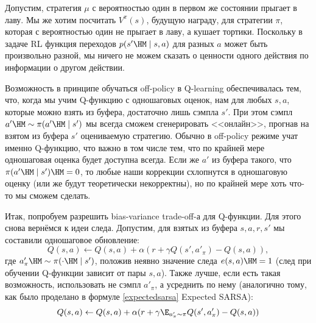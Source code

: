 \begin{example}
Допустим, стратегия $\mu$ с вероятностью один в первом же состоянии прыгает в лаву. Мы же хотим посчитать $V^\pi(s)$, будущую награду, для стратегии $\pi$, которая с вероятностью один не прыгает в лаву, а кушает тортики. Поскольку в задаче RL функция переходов $p(s' \HM \mid s, a)$ для разных $a$ может быть произвольно разной, мы ничего не можем сказать о ценности одного действия по информации о другом действии.
\end{example}

Возможность в принципе обучаться off-policy в Q-learning обеспечивалась тем, что, когда мы учим Q-функцию с одношаговых оценок, нам для любых $s, a$, которые можно взять из буфера, достаточно лишь сэмпла $s'$. При этом сэмпл $a' \HM \sim \pi(a' \HM\mid s')$ мы всегда сможем сгенерировать <<онлайн>>, прогнав на взятом из буфера $s'$ оцениваемую стратегию. Обычно в off-policy режиме учат именно Q-функцию, что важно в том числе тем, что по крайней мере одношаговая оценка будет доступна всегда. Если же $a'$ из буфера такого, что $\pi(a' \HM \mid s') \HM= 0$, то любые наши коррекции схлопнутся в одношаговую оценку (или же будут теоретически некорректны), но по крайней мере хоть что-то мы сможем сделать.

Итак, попробуем разрешить bias-variance trade-off-а для Q-функции. Для этого снова вернёмся к идеи следа. Допустим, для взятых из буфера $s, a, r, s'$ мы составили одношаговое обновление:
$$Q(s, a) \leftarrow Q(s, a) + \alpha (r + \gamma Q(s', a'_\pi) - Q(s, a)),$$
где $a'_\pi \HM \sim \pi(\cdot \HM \mid s')$, положив неявно значение следа $e(s, a) \HM= 1$ (след при обучении Q-функции зависит от пары $s, a$). Также лучше, если есть такая возможность, использовать не сэмпл $a'_\pi$, а усреднить по нему (аналогично тому, как было проделано в формуле \eqref{expectedsarsa} Expected SARSA):
\begin{equation}\label{offpolicytwostepupdatefirstpart}
Q(s, a) \leftarrow Q(s, a) + \alpha (r + \gamma \E_{a'_\pi \sim \pi} Q(s', a'_\pi) - Q(s, a))
\end{equation}

